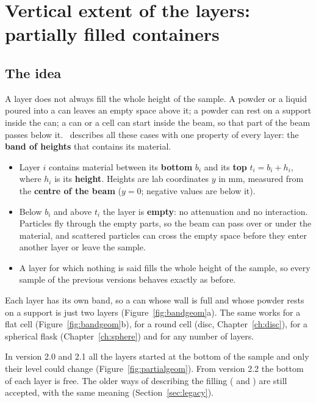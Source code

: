 \chapter{Vertical extent of the layers: partially filled containers}
\label{ch:partial}

\section{The idea}

A layer does not always fill the whole height of the sample. A powder or a liquid poured into a can leaves an
empty space above it; a powder can rest on a support inside the can; a can or a cell can start inside the beam,
so that part of the beam passes below it. \mcams\ describes all these cases with one property of every layer:
the \textbf{band of heights} that contains its material.

\begin{itemize}
  \item Layer $i$ contains material between its \textbf{bottom} $b_i$ and its \textbf{top} $t_i = b_i + h_i$,
        where $h_i$ is its \textbf{height}. Heights are lab coordinates $y$ in mm, measured from the
        \textbf{centre of the beam} ($y=0$; negative values are below it).
  \item Below $b_i$ and above $t_i$ the layer is \textbf{empty}: no attenuation and no interaction. Particles fly
        through the empty parts, so the beam can pass over or under the material, and scattered particles can
        cross the empty space before they enter another layer or leave the sample.
  \item A layer for which nothing is said fills the whole height of the sample, so every sample of the previous
        versions behaves exactly as before.
\end{itemize}
Each layer has its own band, so a can whose wall is full and whose powder rests on a support is just two layers
(Figure~\ref{fig:bandgeom}a). The same works for a flat cell (Figure~\ref{fig:bandgeom}b), for a round cell (disc, Chapter~\ref{ch:disc}),
for a spherical flask (Chapter~\ref{ch:sphere}) and for any number of layers.

\begin{note}
In version 2.0 and 2.1 all the layers started at the bottom of the sample and only their level could change
(Figure~\ref{fig:partialgeom}). From version 2.2 the bottom of each layer is free. The older ways of describing
the filling ( and ) are still accepted, with the same meaning
(Section~\ref{sec:legacy}).
\end{note}

